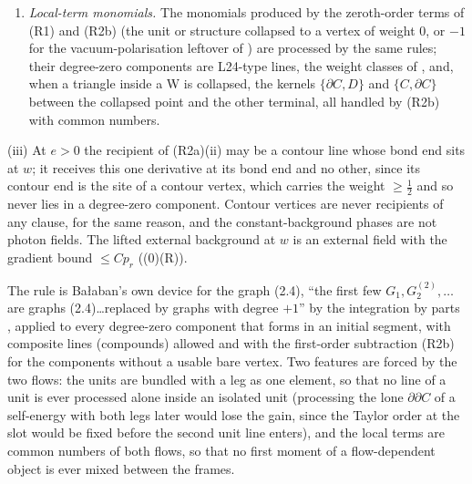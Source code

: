 \begin{definition}
\begin{enumerate}[label=\textup{(R\arabic*)},leftmargin=*]
\begin{enumerate}[label=\textup{(\alph*)},leftmargin=*]
\item Else $H$ has at most one vertex with outside elements or externals and is a common number ( with $a=0$; both flows evaluate the same closed lattice sum), bounded per flow by : a vertex weight $0$, never a switched element.
\end{enumerate}
\item\emph{Local-term monomials.} The monomials produced by the zeroth-order terms of (R1) and (R2b) (the unit or structure collapsed to a vertex of weight $0$, or $-1$ for the vacuum-polarisation leftover of ) are processed by the same rules; their degree-zero components are L24-type lines, the weight classes of , and, when a triangle inside a W is collapsed, the kernels $\{\partial C,D\}$ and $\{C,\partial C\}$ between the collapsed point and the other terminal, all handled by (R2b) with common numbers.
\end{enumerate}
\textup{(iii)} At $e>0$ the recipient of (R2a)(ii) may be a contour line \cite[(3.27)]{K1} whose bond end sits at $w$; it receives this one derivative at its bond end and no other, since its contour end is the site of a contour vertex, which carries the weight $\ge\frac12$ and so never lies in a degree-zero component. Contour vertices are never recipients of any clause, for the same reason, and the constant-background phases \cite[(3.46)]{K1} are not photon fields. The lifted external background at $w$ is an external field with the gradient bound $\le Cp_r$ ((0)(R)).
\end{definition}

The rule is Ba{\l}aban's own device for the graph (2.4), ``the first few $G_1,G_2^{(2)},\dots$ are graphs (2.4)\dots replaced by graphs with degree $+1$'' by the integration by parts \cite[(2.8)]{Ba3}, applied to every degree-zero component that forms in an initial segment, with composite lines (compounds) allowed and with the first-order subtraction (R2b) for the components without a usable bare vertex. Two features are forced by the two flows: the units are bundled with a leg as one element, so that no line of a unit is ever processed alone inside an isolated unit (processing the lone $\partial\partial C$ of a self-energy with both legs later would lose the gain, since the Taylor order at the slot would be fixed before the second unit line enters), and the local terms are common numbers of both flows, so that no first moment of a flow-dependent object is ever mixed between the frames.
